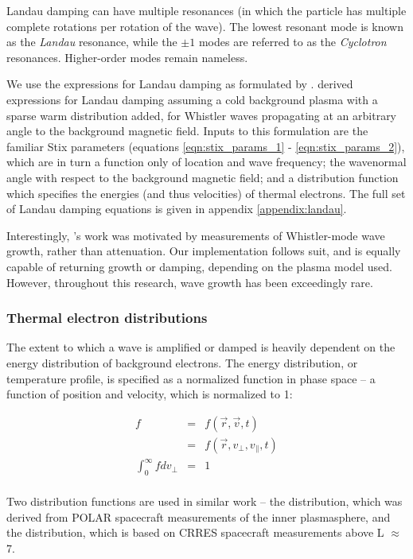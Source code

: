 Landau damping can have multiple resonances (in which the particle has multiple complete rotations per rotation of the wave). The lowest resonant mode is known as the \emph{Landau} resonance, while the $\pm 1$ modes are referred to as the \emph{Cyclotron} resonances. Higher-order modes remain nameless.

We use the expressions for Landau damping as formulated by \cite{Brinca1972}. \citeauthor{Brinca1972} derived expressions for Landau damping assuming a cold background plasma with a sparse warm distribution added, for Whistler waves propagating at an arbitrary angle to the background magnetic field. Inputs to this formulation are the familiar Stix parameters (equations \ref{eqn:stix_params_1} - \ref{eqn:stix_params_2}), which are in turn a function only of location and wave frequency; the wavenormal angle with respect to the background magnetic field; and a distribution function which specifies the energies (and thus velocities) of thermal electrons. The full set of Landau damping equations is given in appendix \ref{appendix:landau}.

Interestingly, \citeauthor{Brinca1972}'s work was motivated by measurements of Whistler-mode wave growth, rather than attenuation. Our implementation follows suit, and is equally capable of returning growth or damping, depending on the plasma model used. However, throughout this research, wave growth has been exceedingly rare.

\subsubsection{Thermal electron distributions}
\label{section:thermal_electron_distributions}
The extent to which a wave is amplified or damped is heavily dependent on the energy distribution of background electrons. The energy distribution, or temperature profile, is specified as a normalized function in phase space -- a function of position and velocity, which is normalized to 1:

\begin{eqnarray}
f  & = & f(\vec{r}, \vec{v}, t) \\
& =  & f(\vec{r}, v_\perp, v_\parallel, t) \\
\int_0^\infty f d v_\perp & = & 1 \\
\end{eqnarray}

Two distribution functions are used in similar work -- the \cite{Bell2002} distribution, which was derived from POLAR spacecraft measurements of the inner plasmasphere, and the \cite{Bortnik2007} distribution, which is based on CRRES spacecraft measurements above L $\approx$ 7.

